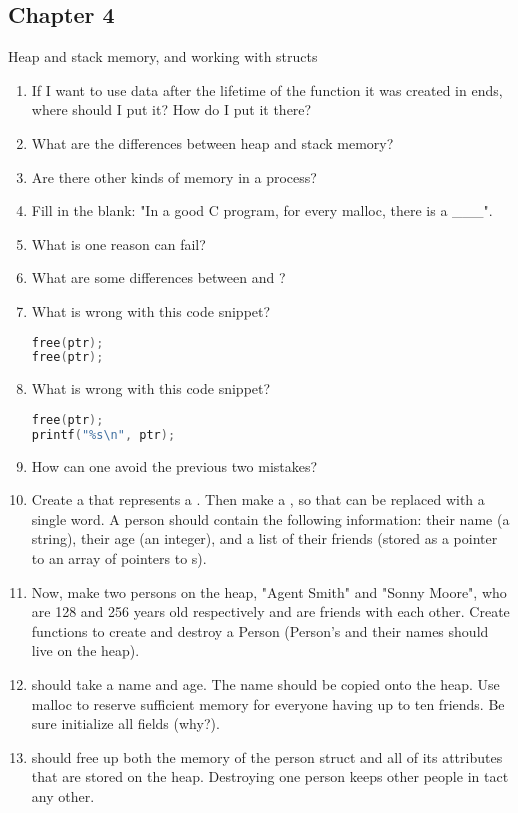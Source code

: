 \subsection{Chapter 4}

Heap and stack memory, and working with structs

\begin{enumerate}
\item If I want to use data after the lifetime of the function it was created in ends, where should I put it? How do I put it there?
\item What are the differences between heap and stack memory?
\item Are there other kinds of memory in a process?
\item Fill in the blank: "In a good C program, for every malloc, there is a \_\_\_".
\item What is one reason  can fail?
\item What are some differences between  and ?
\item What is wrong with this code snippet?
\begin{lstlisting}[language=C]
free(ptr);
free(ptr);
\end{lstlisting}
\item What is wrong with this code snippet?
\begin{lstlisting}[language=C]
free(ptr);
printf("%s\n", ptr);
\end{lstlisting}
\item How can one avoid the previous two mistakes?
\item Create a  that represents a .
  Then make a , so that  can be replaced with a single word.
  A person should contain the following information: their name (a string), their age (an integer), and a list of their friends (stored as a pointer to an array of pointers to s).
\item Now, make two persons on the heap, "Agent Smith" and "Sonny Moore", who are 128 and 256 years old respectively and are friends with each other.
Create functions to create and destroy a Person (Person's and their names should live on the heap).
\item {} should take a name and age.
  The name should be copied onto the heap.
  Use malloc to reserve sufficient memory for everyone having up to ten friends.
  Be sure initialize all fields (why?).
\item {} should free up both the memory of the person struct and all of its attributes that are stored on the heap. Destroying one person keeps other people in tact any other.
\end{enumerate}

